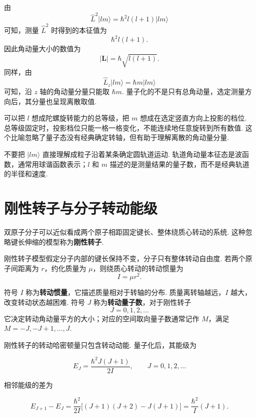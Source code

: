 \documentclass[UTF8,11pt,a4paper,openany]{ctexbook}
\newcommand{\ket}[1]{\lvert #1\rangle}\newcommand{\bra}[1]{\langle #1\rvert}
\newcommand{\term}[1]{\textbf{#1}}
\begin{document}
\begin{derivationbox}
由
\[
\hat L^2\ket{lm}
=\hbar^2l(l+1)\ket{lm}
\]
可知，测量 $\hat L^2$ 时得到的本征值为
\[
\hbar^2l(l+1).
\]
因此角动量大小的数值为
\[
|\boldsymbol L|=\hbar\sqrt{l(l+1)}.
\]
同样，由
\[
\hat L_z\ket{lm}=\hbar m\ket{lm}
\]
可知，沿 $z$ 轴的角动量分量只能取 $\hbar m$. 量子化的不是只有总角动量，选定测量方向后，其分量也呈现离散取值. 
\end{derivationbox}

\begin{analogybox}
可以把 $l$ 想成陀螺旋转能力的总等级，把 $m$ 想成在选定竖直方向上投影的档位. 总等级固定时，投影档位只能一格一格变化，不能连续地任意旋转到所有数值. 这个比喻忽略了量子态没有经典确定转轴，但有助于理解离散的角动量分量. 
\end{analogybox}

\begin{limitbox}
不要把 $\ket{lm}$ 直接理解成粒子沿着某条确定圆轨道运动. 轨道角动量本征态是波函数，通常用球谐函数表示；$l$ 和 $m$ 描述的是测量结果的量子数，而不是经典轨道的半径和速度. 
\end{limitbox}

\section{刚性转子与分子转动能级}

双原子分子可以近似看成两个原子相距固定键长、整体绕质心转动的系统. 这种忽略键长伸缩的模型称为\term{刚性转子}. 

\begin{definitionbox}
刚性转子模型假定分子内部的键长保持不变，分子只有整体转动自由度. 若两个原子间距离为 $r$，约化质量为 $\mu$，则绕质心转动的转动惯量为
\[
I=\mu r^2.
\]
\end{definitionbox}

\begin{notationbox}
符号 $I$ 称为\term{转动惯量}，它描述质量相对于转轴的分布. 质量离转轴越远，$I$ 越大，改变转动状态越困难. 符号 $J$ 称为\term{转动量子数}，对于刚性转子
\[
J=0,1,2,\ldots
\]
它决定转动角动量平方的大小；对应的空间取向量子数通常记作 $M$，满足 $M=-J,-J+1,\ldots,J$. 
\end{notationbox}

刚性转子的转动哈密顿量只包含转动动能. 量子化后，其能级为

\[
E_J=\frac{\hbar^2J(J+1)}{2I},
\qquad J=0,1,2,\ldots
\]

相邻能级的差为

\[
E_{J+1}-E_J
=\frac{\hbar^2}{2I}\bigl[(J+1)(J+2)-J(J+1)\bigr]
=\frac{\hbar^2}{I}(J+1).
\]
\end{document}
